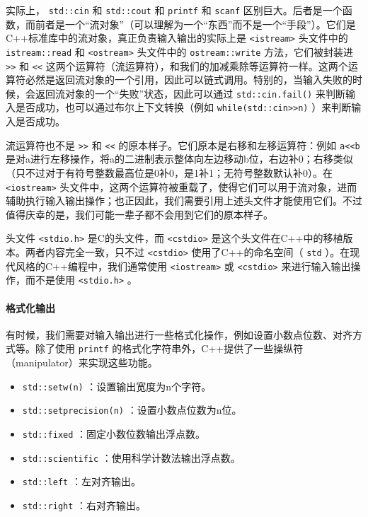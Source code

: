 \begin{note}
  实际上， \texttt{std::cin} 和 \texttt{std::cout} 和 \texttt{printf} 和 \texttt{scanf} 区别巨大。后者是一个函数，而前者是一个“流对象”（可以理解为一个“东西”而不是一个“手段”）。它们是C++标准库中的流对象，真正负责输入输出的实际上是 \texttt{<istream>} 头文件中的 \texttt{istream::read} 和 \texttt{<ostream>} 头文件中的 \texttt{ostream::write} 方法，它们被封装进 \texttt{>>} 和 \texttt{<<} 这两个运算符（流运算符），和我们的加减乘除等运算符一样。这两个运算符必然是返回流对象的一个引用，因此可以链式调用。特别的，当输入失败的时候，会返回流对象的一个“失败”状态，因此可以通过 \texttt{std::cin.fail()} 来判断输入是否成功，也可以通过布尔上下文转换（例如 \texttt{while(std::cin>>n)} ）来判断输入是否成功。

  流运算符也不是 \texttt{>>} 和 \texttt{<<} 的原本样子。它们原本是右移和左移运算符：例如 \texttt{a<<b} 是对a进行左移操作，将a的二进制表示整体向左边移动b位，右边补0；右移类似（只不过对于有符号整数最高位是0补0，是1补1；无符号整数默认补0）。在 \texttt{<iostream>} 头文件中，这两个运算符被重载了，使得它们可以用于流对象，进而辅助执行输入输出操作；也正因此，我们需要引用上述头文件才能使用它们。不过值得庆幸的是，我们可能一辈子都不会用到它们的原本样子。

  头文件 \texttt{<stdio.h>} 是C的头文件，而 \texttt{<cstdio>} 是这个头文件在C++中的移植版本。两者内容完全一致，只不过 \texttt{<cstdio>} 使用了C++的命名空间（ \texttt{std} ）。在现代风格的C++编程中，我们通常使用 \texttt{<iostream>} 或 \texttt{<cstdio>} 来进行输入输出操作，而不是使用 \texttt{<stdio.h>} 。
\end{note}

\paragraph{格式化输出}

有时候，我们需要对输入输出进行一些格式化操作，例如设置小数点位数、对齐方式等。除了使用 \verb|printf| 的格式化字符串外，C++提供了一些操纵符（manipulator）来实现这些功能。
\begin{itemize}
  \item  \texttt{std::setw(n)} ：设置输出宽度为n个字符。
  \item  \texttt{std::setprecision(n)} ：设置小数点位数为n位。
  \item  \texttt{std::fixed} ：固定小数位数输出浮点数。
  \item  \texttt{std::scientific} ：使用科学计数法输出浮点数。
  \item  \texttt{std::left} ：左对齐输出。
  \item  \texttt{std::right} ：右对齐输出。
\end{itemize}


